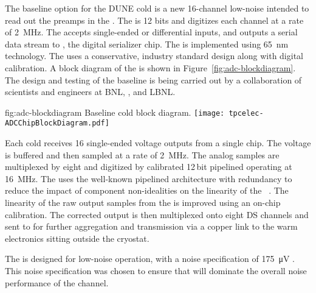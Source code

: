 The baseline option for the DUNE cold  is a new \num{16}-channel low-noise   intended to read out the  preamps in the  . The  is \num{12} bits and digitizes each channel at a rate of \SI{2}{MHz}. The  accepts single-ended or differential inputs, and outputs a serial data stream to , the  %
digital serializer chip. The   is implemented using \SI{65}{nm}  technology. The  uses a conservative, industry standard design along with digital calibration. A block diagram of the   is shown in Figure~\ref{fig:adc-blockdiagram}. The design and testing of the baseline   is being carried out by a collaboration of scientists and engineers at BNL, \fnal, and LBNL.

\begin{dunefigure}
{fig:adc-blockdiagram}
{Baseline cold   block diagram.}
\texttt{[image: tpcelec-ADCChipBlockDiagram.pdf]}
\end{dunefigure}

Each cold  receives \num{16} single-ended voltage outputs from a single  chip. The voltage is buffered and then sampled at a rate of \SI{2}{MHz}. The analog samples are multiplexed by eight and digitized by calibrated \num{12}\,bit pipelined  operating at \SI{16}{MHz}. The  uses the well-known pipelined architecture with redundancy to reduce the impact of component non-idealities on the linearity of the ~\cite{121557}. The linearity of the raw output samples from the  is improved using an on-chip calibration. The corrected  output is then multiplexed onto eight DS channels and sent to  for further aggregation and transmission via a copper link to the warm electronics sitting outside the cryostat.

The   is designed for low-noise operation, with a noise specification of  \SI{175}{\micro\volt} \rms. This noise specification was chosen to ensure that  will dominate the overall noise performance of the channel.

